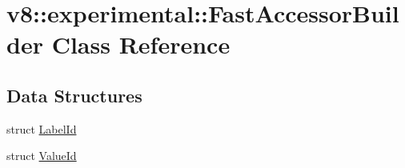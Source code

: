 \hypertarget{classv8_1_1experimental_1_1FastAccessorBuilder}{}\section{v8\+:\+:experimental\+:\+:Fast\+Accessor\+Builder Class Reference}
\label{classv8_1_1experimental_1_1FastAccessorBuilder}
\subsection*{Data Structures}
\begin{DoxyCompactItemize}
\item 
struct \hyperlink{structv8_1_1experimental_1_1FastAccessorBuilder_1_1LabelId}{Label\+Id}
\item 
struct \hyperlink{structv8_1_1experimental_1_1FastAccessorBuilder_1_1ValueId}{Value\+Id}
\end{DoxyCompactItemize}
